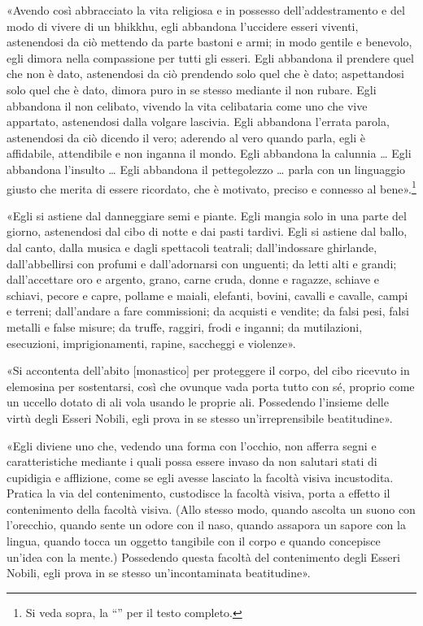 «Avendo così abbracciato la vita religiosa e in possesso
dell’addestramento e del modo di vivere di un bhikkhu, egli abbandona
l’uccidere esseri viventi, astenendosi da ciò mettendo da parte bastoni
e armi; in modo gentile e benevolo, egli dimora nella compassione per
tutti gli esseri. Egli abbandona il prendere quel che non è dato,
astenendosi da ciò prendendo solo quel che è dato; aspettandosi solo
quel che è dato, dimora puro in se stesso mediante il non rubare. Egli
abbandona il non celibato, vivendo la vita celibataria come uno che vive
appartato, astenendosi dalla volgare lascivia. Egli abbandona l’errata
parola, astenendosi da ciò dicendo il vero; aderendo al vero quando
parla, egli è affidabile, attendibile e non inganna il mondo. Egli
abbandona la calunnia … Egli abbandona l’insulto … Egli abbandona il
pettegolezzo … parla con un linguaggio giusto che merita di essere
ricordato, che è motivato, preciso e connesso al
bene».\footnote{Si veda sopra, la “\hyperlink{pag265}{}” per il testo completo.}


«Egli si astiene dal danneggiare semi e piante. Egli mangia solo in una
parte del giorno, astenendosi dal cibo di notte e dai pasti tardivi.
Egli si astiene dal ballo, dal canto, dalla musica e dagli spettacoli
teatrali; dall’indossare ghirlande, dall’abbellirsi con profumi e
dall’adornarsi con unguenti; da letti alti e grandi; dall’accettare oro
e argento, grano, carne cruda, donne e ragazze, schiave e schiavi,
pecore e capre, pollame e maiali, elefanti, bovini, cavalli e cavalle,
campi e terreni; dall’andare a fare commissioni; da acquisti e vendite;
da falsi pesi, falsi metalli e false misure; da truffe, raggiri, frodi e
inganni; da mutilazioni, esecuzioni, imprigionamenti, rapine, saccheggi
e violenze».


«Si accontenta dell’abito [monastico] per proteggere il corpo, del cibo
ricevuto in elemosina per sostentarsi, così che ovunque vada porta tutto
con sé, proprio come un uccello dotato di ali vola usando le proprie
ali. Possedendo l’insieme delle virtù degli Esseri Nobili, egli prova in
se stesso un’irreprensibile beatitudine».


«Egli diviene uno che, vedendo una forma con l’occhio, non afferra segni
e caratteristiche mediante i quali possa essere invaso da non salutari
stati di cupidigia e afflizione, come se egli avesse lasciato la facoltà
visiva incustodita. Pratica la via del contenimento, custodisce la
facoltà visiva, porta a effetto il contenimento della facoltà visiva.
(Allo stesso modo, quando ascolta un suono con l’orecchio, quando sente
un odore con il naso, quando assapora un sapore con la lingua, quando
tocca un oggetto tangibile con il corpo e quando concepisce un’idea con
la mente.) Possedendo questa facoltà del contenimento degli Esseri
Nobili, egli prova in se stesso un’incontaminata beatitudine».


